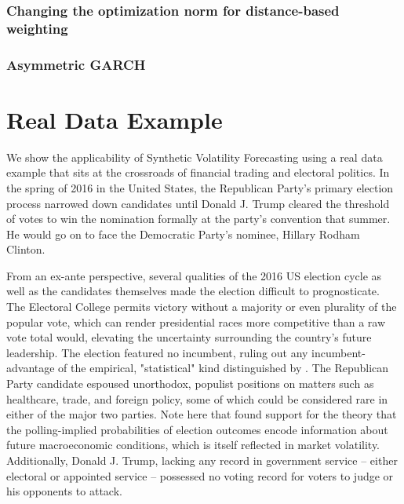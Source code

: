\documentclass[11pt]{article}
\theoremstyle{definition}
\begin{document}
\subsubsection{Changing the optimization norm for distance-based weighting}

\subsubsection{Asymmetric GARCH}

\section{Real Data Example}

We show the applicability of Synthetic Volatility Forecasting using a real data example that sits at the crossroads of financial trading and electoral politics.  In the spring of 2016 in the United States, the Republican Party's primary election process narrowed down candidates until Donald J. Trump cleared the threshold of votes to win the nomination formally at the party's convention that summer.  He would go on to face the Democratic Party's nominee, Hillary Rodham Clinton.   

From an ex-ante perspective, several qualities of the 2016 US election cycle as well as the candidates themselves made the election difficult to prognosticate.  The Electoral College permits victory without a majority or even plurality of the popular vote, which can render presidential races more competitive than a raw vote total would, elevating the uncertainty surrounding the country's future leadership.  The election featured no incumbent, ruling out any incumbent-advantage of the empirical, "statistical" kind distinguished by \citet{mayhew2008incumbency}.  The Republican Party candidate espoused unorthodox, populist positions on matters such as healthcare, trade, and foreign policy, some of which could be considered rare in either of the major two parties.  Note here that \citet{goodell2013us} found support for the theory that the polling-implied probabilities of election outcomes encode information about future macroeconomic conditions, which is itself reflected in market volatility.  Additionally, Donald J. Trump, lacking any record in government service -- either electoral or appointed service -- possessed no voting record for voters to judge or his opponents to attack.  
\end{document}
